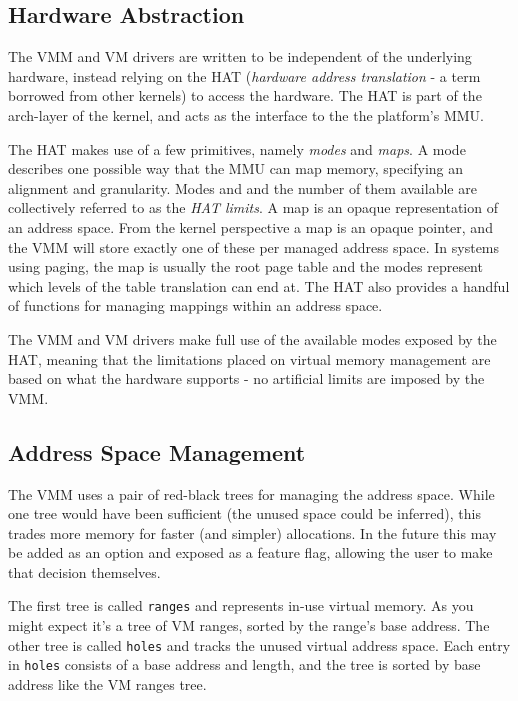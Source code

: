 \subsection{Hardware Abstraction}
The VMM and VM drivers are written to be independent of the underlying hardware, instead relying on the HAT (\textit{hardware address translation} - a term borrowed from other kernels) to access the hardware. The HAT is part of the arch-layer of the kernel, and acts as the interface to the the platform's MMU.

The HAT makes use of a few primitives, namely \textit{modes} and \textit{maps}. A mode describes one possible way that the MMU can map memory, specifying an alignment and granularity. Modes and and the number of them available are collectively referred to as the \textit{HAT limits}. A map is an opaque representation of an address space. From the kernel perspective a map is an opaque pointer, and the VMM will store exactly one of these per managed address space. In systems using paging, the map is usually the root page table and the modes represent which levels of the table translation can end at. The HAT also provides a handful of functions for managing mappings within an address space.

The VMM and VM drivers make full use of the available modes exposed by the HAT, meaning that the limitations placed on virtual memory management are based on what the hardware supports - no artificial limits are imposed by the VMM.

\subsection{Address Space Management}
The VMM uses a pair of red-black trees for managing the address space. While one tree would have been sufficient (the unused space could be inferred), this trades more memory for faster (and simpler) allocations. In the future this may be added as an option and exposed as a feature flag, allowing the user to make that decision themselves.

The first tree is called \lstinline{ranges} and represents in-use virtual memory. As you might expect it's a tree of VM ranges, sorted by the range's base address. The other tree is called \lstinline{holes} and tracks the unused virtual address space. Each entry in \lstinline{holes} consists of a base address and length, and the tree is sorted by base address like the VM ranges tree.


